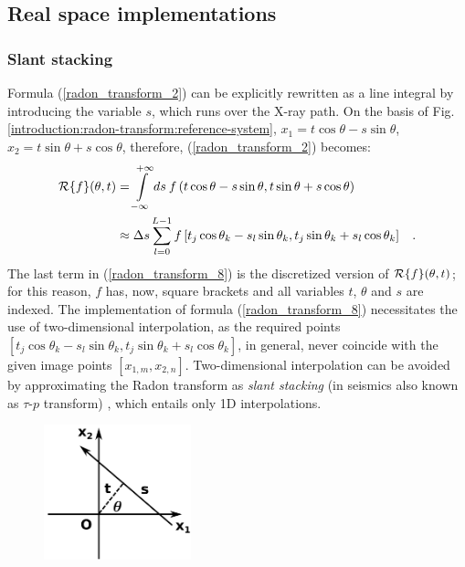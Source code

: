 {\subsection{Real space implementations}
\label{introduction:radon-transform:real-space-implementations}

\subsubsection{Slant stacking}
Formula (\ref{radon_transform_2}) can be explicitly rewritten as a line integral by introducing the variable
$s$, which runs over the X-ray path. On the basis of Fig. \ref{introduction:radon-transform:reference-system},
$x_{1} = t\cos\theta - s\sin\theta$, $x_{2} = t\sin\theta + s\cos\theta$, therefore, (\ref{radon_transform_2}) becomes:
\begin{equation}
\begin{split}
  \operatorname{\mathcal{R}}\{f\}(\theta,t) &= \int\limits_{-\infty}^{+\infty}ds\:f\left( t\cos\theta - s\sin\theta, t\sin\theta + s\cos\theta \right)\\
  &\approx \Delta s \sum\limits_{l=0}^{L-1} f\left[t_{j}\cos\theta_{k} - s_{l}\sin\theta_{k}, t_{j}\sin\theta_{k} + s_{l}\cos\theta_{k}\right]\hspace{0.3cm}.  
\end{split}  
  \label{radon_transform_8}
\end{equation}
The last term in (\ref{radon_transform_8}) is the discretized version of $\operatorname{\mathcal{R}}\{f\}(\theta,t)$; for this reason,
$f$ has, now, square brackets and all variables $t$, $\theta$ and $s$ are indexed.
The implementation of formula (\ref{radon_transform_8}) necessitates the use of two-dimensional interpolation,
as the required points $[t_{j}\cos\theta_{k} - s_{l}\sin\theta_{k},t_{j}\sin\theta_{k} + s_{l}\cos\theta_{k}]$, in general,
never coincide with the given image points $[x_{1,m},x_{2,n}]$. Two-dimensional interpolation can be avoided by approximating
the Radon transform as \emph{slant stacking} (in seismics also known as $\tau$-$p$ transform) \cite{Toft1996},
which entails only 1D interpolations.
\begin{figure}[!h]
  \begin{center}
    \includegraphics[width=0.38\textwidth]{images/introduction_radon_transform_refsystem.pdf}

\end{center}
\end{figure}}
